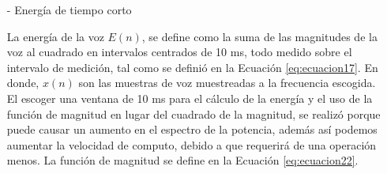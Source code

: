 \begin{enumerate}
\begin{enumerate}
\begin{enumerate}
\item[-]Energía de tiempo corto
\par
La energía de la voz $E(n)$, se define como la suma de las magnitudes de la voz al cuadrado en intervalos centrados de 10 ms, todo medido sobre el intervalo de medición, tal como se definió en la Ecuación \eqref{eq:ecuacion17}.
\vskip 0.5cm
En donde, $x(n)$ son las muestras de voz muestreadas a la frecuencia escogida. El escoger una ventana de 10 ms para el cálculo de la energía y el uso de la función de magnitud en lugar del cuadrado de la magnitud, se realizó porque puede causar un aumento en el espectro de la potencia, además así podemos aumentar la velocidad de computo, debido a que requerirá de una operación menos. La función de magnitud se define en la Ecuación \eqref{eq:ecuacion22}.


\end{enumerate}
\end{enumerate}
\end{enumerate}
